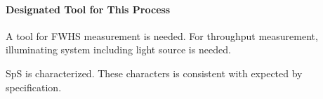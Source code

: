 \paragraph{Designated Tool for This Process}
A tool for FWHS measurement is needed.
For throughput measurement, illuminating system including light source is needed.

\begin{itembox}[l]{}
SpS is characterized. These characters is consistent with expected by specification.
\end{itembox}